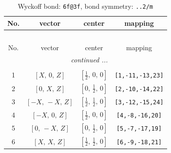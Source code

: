 \documentclass[fleqn,8pt]{jsarticle}
\begin{document}
\begin{longtable}{cccc}
\caption{Wyckoff bond: {\tt 6f@3f}, bond symmetry: {\tt ..2/m}}
 \\
 \hline \hline
No. & vector & center & mapping \\ \hline \endfirsthead

\multicolumn{3}{l}{\tablename\ \thetable{}} \\
 \hline \hline
No. & vector & center & mapping \\ \hline \endhead

 \hline \hline
\multicolumn{3}{r}{\footnotesize\it continued ...} \\ \endfoot

 \hline \hline
\multicolumn{3}{r}{} \\ \endlastfoot

1 & $\left[ X,\, 0,\, Z \right]$ & $\left[ \frac{1}{2},\, 0,\, 0 \right]$ & {\tt [1,-11,-13,23]} \\ \hline
2 & $\left[ 0,\, X,\, Z \right]$ & $\left[ 0,\, \frac{1}{2},\, 0 \right]$ & {\tt [2,-10,-14,22]} \\ \hline
3 & $\left[ - X,\, - X,\, Z \right]$ & $\left[ \frac{1}{2},\, \frac{1}{2},\, 0 \right]$ & {\tt [3,-12,-15,24]} \\ \hline
4 & $\left[ - X,\, 0,\, Z \right]$ & $\left[ \frac{1}{2},\, 0,\, 0 \right]$ & {\tt [4,-8,-16,20]} \\ \hline
5 & $\left[ 0,\, - X,\, Z \right]$ & $\left[ 0,\, \frac{1}{2},\, 0 \right]$ & {\tt [5,-7,-17,19]} \\ \hline
6 & $\left[ X,\, X,\, Z \right]$ & $\left[ \frac{1}{2},\, \frac{1}{2},\, 0 \right]$ & {\tt [6,-9,-18,21]} \\
\end{longtable}
\renewcommand{\arraystretch}{1.2}
\end{document}
